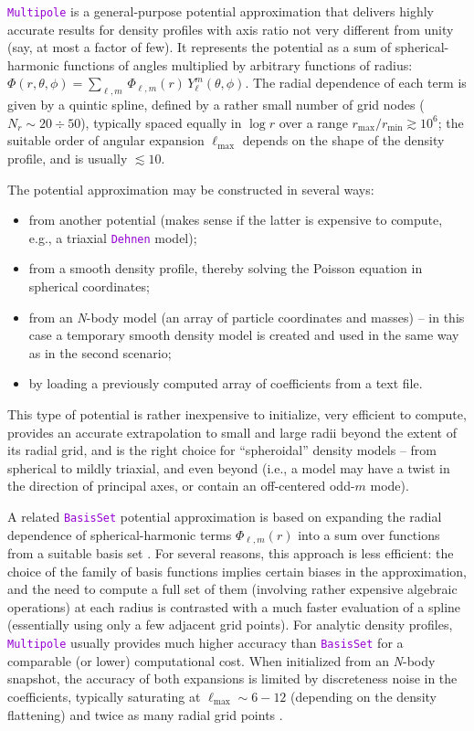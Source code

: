 \documentclass[12pt]{article}
\newcommand{\Nbody}{\textsl{N}-body\xspace}
\newcommand{\ttt}[1]{\textcolor{darkviolet}{\texttt{#1}}}
\begin{document}
\ttt{Multipole} is a general-purpose potential approximation that delivers highly accurate results for density profiles with axis ratio not very different from unity (say, at most a factor of few). It represents the potential as a sum of spherical-harmonic functions of angles multiplied by arbitrary functions of radius: $\Phi(r,\theta,\phi) = \sum_{\ell,m}\, \Phi_{\ell,m}(r)\, Y_\ell^m(\theta,\phi)$. The radial dependence of each term is given by a quintic spline, defined by a rather small number of grid nodes ($N_r\sim 20\div 50$), typically spaced equally in $\log r$ over a range $r_\mathrm{max}/r_\mathrm{min} \gtrsim 10^6$; the suitable order of angular expansion $\ell_\mathrm{max}$ depends on the shape of the density profile, and is usually $\lesssim 10$.

The potential approximation may be constructed in several ways:
\begin{itemize} \setlength{\parskip}{0pt} \setlength{\itemsep}{2pt}
\item from another potential (makes sense if the latter is expensive to compute, e.g., a triaxial \ttt{Dehnen} model);
\item from a smooth density profile, thereby solving the Poisson equation in spherical coordinates;
\item from an \Nbody model (an array of particle coordinates and masses) -- in this case a temporary smooth density model is created and used in the same way as in the second scenario;
\item by loading a previously computed array of coefficients from a text file.
\end{itemize}

This type of potential is rather inexpensive to initialize, very efficient to compute, provides an accurate extrapolation to small and large radii beyond the extent of its radial grid, and is the right choice for ``spheroidal'' density models -- from spherical to mildly triaxial, and even beyond (i.e., a model may have a twist in the direction of principal axes, or contain an off-centered odd-$m$ mode).

A related \ttt{BasisSet} potential approximation is based on expanding the radial dependence of spherical-harmonic terms $\Phi_{\ell,m}(r)$ into a sum over functions from a suitable basis set \cite{HernquistOstriker1992,Zhao1996}. For several reasons, this approach is less efficient: the choice of the family of basis functions implies certain biases in the approximation, and the need to compute a full set of them (involving rather expensive algebraic operations) at each radius is contrasted with a much faster evaluation of a spline (essentially using only a few adjacent grid points). For analytic density profiles, \ttt{Multipole} usually provides much higher accuracy than \ttt{BasisSet} for a comparable (or lower) computational cost. When initialized from an \Nbody snapshot, the accuracy of both expansions is limited by discreteness noise in the coefficients, typically saturating at $\ell_\mathrm{max} \sim 6-12$ (depending on the density flattening) and twice as many radial grid points \cite{Sanders2020}.
\end{document}
